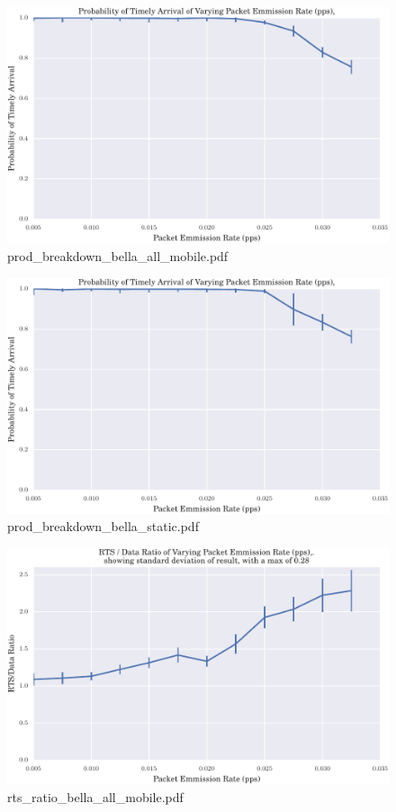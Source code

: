 \documentclass{article}
\begin{document}
\begin{figure}[h!]
\centering
\includegraphics[width=\linewidth]{prod_breakdown_bella_all_mobile.pdf}
\caption{prod\_breakdown\_bella\_all\_mobile.pdf}
\end{figure}




\begin{figure}[h!]
\centering
\includegraphics[width=\linewidth]{prod_breakdown_bella_static.pdf}
\caption{prod\_breakdown\_bella\_static.pdf}
\end{figure}




\begin{figure}[h!]
\centering
\includegraphics[width=\linewidth]{rts_ratio_bella_all_mobile.pdf}
\caption{rts\_ratio\_bella\_all\_mobile.pdf}
\end{figure}
\end{document}
